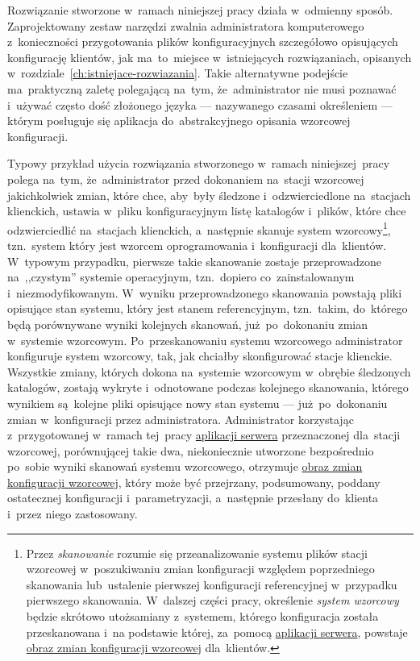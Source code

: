 \documentclass[thesis]{subfiles}
\begin{document}
Rozwiązanie stworzone w~ramach niniejszej pracy działa w~odmienny sposób. Zaprojektowany zestaw narzędzi zwalnia administratora komputerowego z~konieczności przygotowania plików konfiguracyjnych szczegółowo opisujących konfigurację klientów, jak ma~to~miejsce w~istniejących rozwiązaniach, opisanych w~rozdziale~\ref{ch:istniejace-rozwiazania}. Takie alternatywne podejście ma~praktyczną zaletę polegającą na~tym, że~administrator nie musi poznawać i~używać często dość złożonego języka --- nazywanego czasami określeniem  --- którym posługuje się aplikacja do~abstrakcyjnego opisania wzorcowej konfiguracji.

Typowy przykład użycia rozwiązania stworzonego w~ramach niniejszej~pracy polega na~tym, że~administrator przed dokonaniem na~stacji wzorcowej jakichkolwiek zmian, które chce, aby~były śledzone i~odzwierciedlone na~stacjach klienckich, ustawia w~pliku konfiguracyjnym listę katalogów i~plików, które chce odzwierciedlić na~stacjach klienckich, a~następnie skanuje system wzorcowy\footnote{Przez \emph{skanowanie} rozumie się przeanalizowanie systemu plików stacji wzorcowej w~poszukiwaniu zmian konfiguracji względem poprzedniego skanowania lub~ustalenie pierwszej konfiguracji referencyjnej w~przypadku pierwszego skanowania. W~dalszej części pracy, określenie \emph{system wzorcowy} będzie skrótowo utożsamiany z~systemem, którego konfiguracja została przeskanowana i~na podstawie której, za~pomocą \hyperref[sec:srv-app]{aplikacji serwera}, powstaje \hyperref[sec:obraz-zmian-konfiguracji]{obraz zmian konfiguracji wzorcowej} dla~klientów.}, tzn.~system który jest wzorcem oprogramowania i~konfiguracji dla~klientów. W~typowym przypadku, pierwsze takie skanowanie zostaje przeprowadzone na~,,czystym'' systemie operacyjnym, tzn.~dopiero co~zainstalowanym i~niezmodyfikowanym. W~wyniku przeprowadzonego skanowania powstają pliki opisujące stan systemu, który jest stanem referencyjnym, tzn.~takim, do~którego będą porównywane wyniki kolejnych skanowań, już~po~dokonaniu zmian w~systemie wzorcowym. Po~przeskanowaniu systemu wzorcowego administrator konfiguruje system wzorcowy, tak, jak chciałby skonfigurować stacje klienckie. Wszystkie zmiany, których dokona na~systemie wzorcowym w~obrębie śledzonych katalogów, zostają wykryte i~odnotowane podczas kolejnego skanowania, którego wynikiem są~kolejne pliki opisujące nowy stan systemu --- już~po~dokonaniu zmian w~konfiguracji przez administratora. Administrator korzystając z~przygotowanej w~ramach tej~pracy \hyperref[sec:srv-app]{aplikacji serwera} przeznaczonej dla~stacji wzorcowej, porównującej takie dwa, niekoniecznie utworzone bezpośrednio po~sobie wyniki skanowań systemu wzorcowego, otrzymuje \hyperref[sec:obraz-zmian-konfiguracji]{obraz zmian konfiguracji wzorcowej}, który może być przejrzany, podsumowany, poddany ostatecznej konfiguracji i~parametryzacji, a~następnie przesłany do~klienta i~przez niego zastosowany.%
\end{document}
